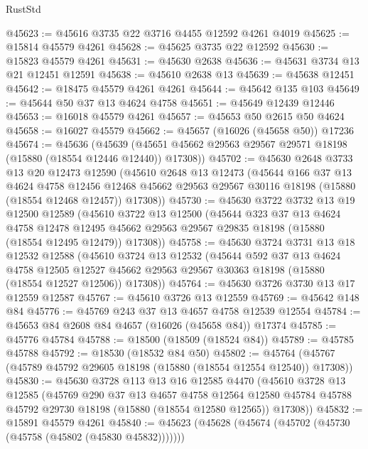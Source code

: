 \begin{lexlean}{RustStd}
\begin{coremodule}
@45623 := @45616 @3735 @22 @3716 @4455 @12592 @4261 @4019
@45625 := @15814 @45579 @4261
@45628 := @45625 @3735 @22 @12592
@45630 := @15823 @45579 @4261
@45631 := @45630 @2638
@45636 := @45631 @3734 @13 @21 @12451 @12591
@45638 := @45610 @2638 @13
@45639 := @45638 @12451
@45642 := @18475 @45579 @4261 @4261
@45644 := @45642 @135 @103
@45649 := @45644 @50 @37 @13 @4624 @4758
@45651 := @45649 @12439 @12446
@45653 := @16018 @45579 @4261
@45657 := @45653 @50 @2615 @50 @4624
@45658 := @16027 @45579
@45662 := @45657 (@16026 (@45658 @50)) @17236
@45674 := @45636
    (@45639 (@45651 @45662 @29563 @29567 @29571 @18198 (@15880 (@18554 @12446 @12440)) @17308))
@45702 := @45630
    @2648
    @3733
    @13
    @20
    @12473
    @12590
    (@45610
      @2648
      @13
      @12473
      (@45644
        @166
        @37
        @13
        @4624
        @4758
        @12456
        @12468
        @45662
        @29563
        @29567
        @30116
        @18198
        (@15880 (@18554 @12468 @12457))
        @17308))
@45730 := @45630
    @3722
    @3732
    @13
    @19
    @12500
    @12589
    (@45610
      @3722
      @13
      @12500
      (@45644
        @323
        @37
        @13
        @4624
        @4758
        @12478
        @12495
        @45662
        @29563
        @29567
        @29835
        @18198
        (@15880 (@18554 @12495 @12479))
        @17308))
@45758 := @45630
    @3724
    @3731
    @13
    @18
    @12532
    @12588
    (@45610
      @3724
      @13
      @12532
      (@45644
        @592
        @37
        @13
        @4624
        @4758
        @12505
        @12527
        @45662
        @29563
        @29567
        @30363
        @18198
        (@15880 (@18554 @12527 @12506))
        @17308))
@45764 := @45630 @3726 @3730 @13 @17 @12559 @12587
@45767 := @45610 @3726 @13 @12559
@45769 := @45642 @148 @84
@45776 := @45769 @243 @37 @13 @4657 @4758 @12539 @12554
@45784 := @45653 @84 @2608 @84 @4657 (@16026 (@45658 @84)) @17374
@45785 := @45776 @45784
@45788 := @18500 (@18509 (@18524 @84))
@45789 := @45785 @45788
@45792 := @18530 (@18532 @84 @50)
@45802 := @45764 (@45767 (@45789 @45792 @29605 @18198 (@15880 (@18554 @12554 @12540)) @17308))
@45830 := @45630
    @3728
    @113
    @13
    @16
    @12585
    @4470
    (@45610
      @3728
      @13
      @12585
      (@45769
        @290
        @37
        @13
        @4657
        @4758
        @12564
        @12580
        @45784
        @45788
        @45792
        @29730
        @18198
        (@15880 (@18554 @12580 @12565))
        @17308))
@45832 := @15891 @45579 @4261
@45840 := @45623 (@45628 (@45674 (@45702 (@45730 (@45758 (@45802 (@45830 @45832)))))))

\end{coremodule}
\end{lexlean}
